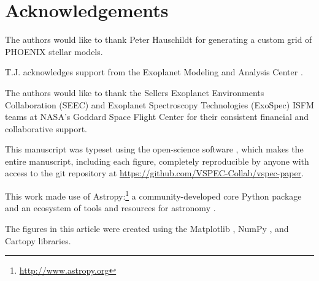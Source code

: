 \documentclass[linenumbers,preprint,authoryear]{elsarticle}
\begin{document}
\section{Acknowledgements}
The authors would like to thank Peter Hauschildt for generating a custom grid of PHOENIX stellar models.

T.J. acknowledges support from the Exoplanet Modeling and Analysis Center \citep[EMAC, ][]{renaud2022}.

The authors would like to thank the Sellers Exoplanet Environments Collaboration (SEEC) and Exoplanet Spectroscopy Technologies (ExoSpec) ISFM teams at NASA's Goddard Space Flight Center for their consistent financial and collaborative support.

This manuscript was typeset using the open-science software \showyourwork, which makes the entire manuscript, including each figure, completely reproducible by anyone with access to the git repository at \url{https://github.com/VSPEC-Collab/vspec-paper}.

This work made use of Astropy:\footnote{\url{http://www.astropy.org}} a community-developed core Python package and an ecosystem of tools and resources for astronomy \citep{astropycollaboration2013,astropycollaboration2018,astropycollaboration2022}.


The figures in this article were created using the Matplotlib \citep{hunter2007}, NumPy \citep{harris2020}, and Cartopy \citep{metoffice2010} libraries.



\end{document}
